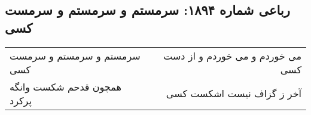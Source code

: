 \begin{center}
\section*{رباعی شماره ۱۸۹۴: سرمستم و سرمستم و سرمست کسی}
\label{sec:1894}
\begin{longtable}{l p{0.5cm} r}
سرمستم و سرمستم و سرمست کسی
&&
می خوردم و می خوردم و از دست کسی
\\
همچون قدحم شکست وانگه پرکرد
&&
آخر ز گزاف نیست اشکست کسی
\\
\end{longtable}
\end{center}
